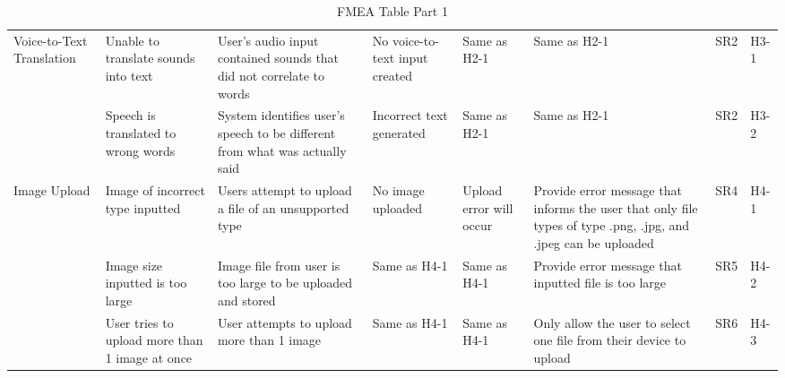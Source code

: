 \documentclass{article}
\begin{document}
\begin{landscape}
\begin{table}[ht]
{\begin{tabular}{|p{2cm}|p{3cm}|p{3cm}|p{3cm}|p{3cm}|p{3cm}|p{1cm}|p{1cm}|}
		Voice-to-Text Translation & Unable to translate sounds into text & User's audio input contained sounds that did not correlate to words & No voice-to-text input created & Same as H2-1  & Same as H2-1 & SR2 & H3-1\\ \cline{2-8}
		& Speech is translated to wrong words & System identifies user's speech to be different from what was actually said & Incorrect text generated & Same as H2-1 & Same as H2-1 & SR2  & H3-2 \\ \hline
		
		Image Upload & Image of incorrect type inputted & Users attempt to upload a file of an unsupported type & No image uploaded & Upload error will occur & Provide error message that informs the user that only file types of type .png, .jpg, and .jpeg can be uploaded & SR4 & H4-1 \\ \cline{2-8}
		& Image size inputted is too large & Image file from user is too large to be uploaded and stored & Same as H4-1 & Same as H4-1 & Provide error message that inputted file is too large & SR5 & H4-2\\ \cline{2-8}
		& User tries to upload more than 1 image at once & User attempts to upload more than 1 image & Same as H4-1 & Same as H4-1 & Only allow the user to select one file from their device to upload & SR6 & H4-3\\ \hline

	\end{tabular}
}

	\caption{FMEA Table Part 1}
	\label{FMEAPart1}
\end{table}
\end{landscape}
\end{document}

